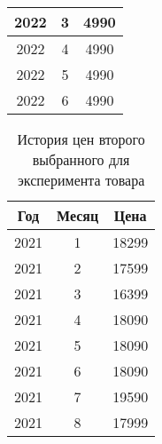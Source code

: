 \documentclass{bmstu}
\begin{document}
\begin{table}[H]
\begin{center}
\begin{tabular}{| c | c | c |}
			\hline
			
			2022 & 3 & 4990 \\
			
			\hline
			
			2022 & 4 & 4990 \\
			
			\hline
			
			2022 & 5 & 4990 \\
			
			\hline
			
			2022 & 6 & 4990 \\
			
			\hline
		\end{tabular}
	\end{center}
\end{table}

\begin{table}[H]
	\caption{История цен второго выбранного для эксперимента товара}
	\begin{center}
		\begin{tabular}{| c | c | c |} 
			\hline
			
			\textbf{Год} & \textbf{Месяц} & \textbf{Цена} \\  
			
			\hline
			
			2021 & 1 & 18299 \\
			
			\hline
			
			2021 & 2 & 17599 \\
			
			\hline
			
			2021 & 3 & 16399 \\
			
			\hline
			
			2021 & 4 & 18090 \\
			
			\hline
			
			2021 & 5 & 18090 \\
			
			\hline
			
			2021 & 6 & 18090 \\
			
			\hline
			
			2021 & 7 & 19590 \\
			
			\hline
			
			2021 & 8 & 17999 \\
			
			\hline
			

\end{tabular}
\end{center}
\end{table}
\end{document}
